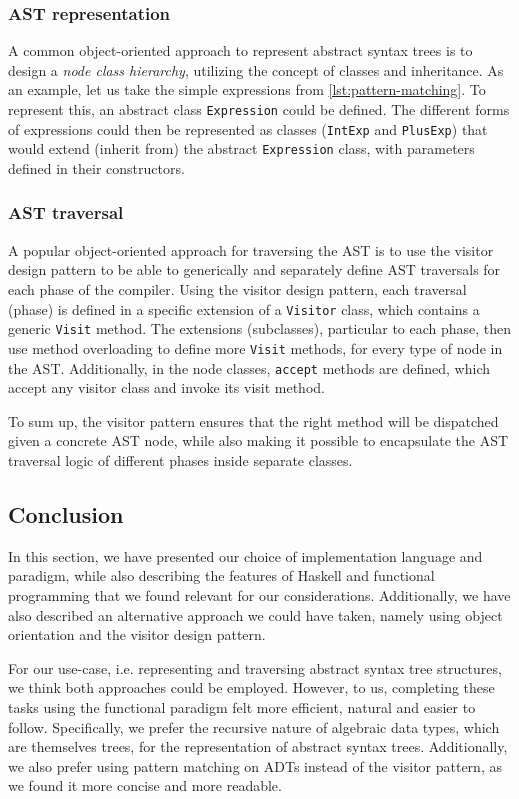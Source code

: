 \subsubsection{AST representation}
A common object-oriented approach to represent abstract syntax trees is to design a \textit{node class hierarchy}, utilizing the concept of classes and inheritance. As an example, let us take the simple expressions from \cref{lst:pattern-matching}. To represent this, an abstract class \lstinline{Expression} could be defined. The different forms of expressions could then be represented as classes (\lstinline{IntExp} and \lstinline{PlusExp}) that would extend (inherit from) the abstract \lstinline{Expression} class, with parameters defined in their constructors. \cite[Section~7.7.1]{craftingCompiler}

\subsubsection{AST traversal}
A popular object-oriented approach for traversing the AST is to use the visitor design pattern to be able to generically and separately define AST traversals for each phase of the compiler. Using the visitor design pattern, each traversal (phase) is defined in a specific extension of a \lstinline{Visitor} class, which contains a generic \lstinline{Visit} method. The extensions (subclasses), particular to each phase, then use method overloading to define more \lstinline{Visit} methods, for every type of node in the AST. Additionally, in the node classes, \lstinline{accept} methods are defined, which accept any visitor class and invoke its visit method. \cite[Section~7.7.2]{craftingCompiler} 
\par 
To sum up, the visitor pattern ensures that the right method will be dispatched given a concrete AST node, while also making it possible to encapsulate the AST traversal logic of different phases inside separate classes.  

\subsection{Conclusion}
In this section, we have presented our choice of implementation language and paradigm, while also describing the features of Haskell and functional programming that we found relevant for our considerations. Additionally, we have also described an alternative approach we could have taken, namely using object orientation and the visitor design pattern.
\par
For our use-case, i.e. representing and traversing abstract syntax tree structures, we think both approaches could be employed. However, to us, completing these tasks using the functional paradigm felt more efficient, natural and easier to follow. Specifically, we prefer the recursive nature of algebraic data types, which are themselves trees, for the representation of abstract syntax trees. Additionally, we also prefer using pattern matching on ADTs instead of the visitor pattern, as we found it more concise and more readable.

\pagebreak